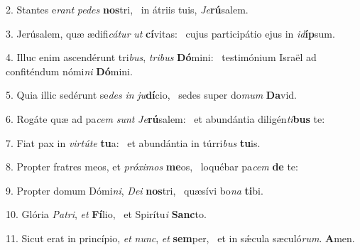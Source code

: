 2. Stantes e\textit{rant} \textit{pe}\textit{des} \textbf{nos}tri, \ast\  in átriis tuis, \textit{Je}\textbf{rú}salem.\

3. Jerúsalem, quæ ædifi\textit{cá}\textit{tur} \textit{ut} \textbf{cí}vitas: \ast\  cujus participátio ejus in \textit{id}\textbf{íp}sum.\

4. Illuc enim ascendérunt tri\textit{bus}, \textit{tri}\textit{bus} \textbf{Dó}mini: \ast\  testimónium Israël ad confiténdum nómi\textit{ni} \textbf{Dó}mini.\

5. Quia illic sedérunt se\textit{des} \textit{in} \textit{ju}\textbf{dí}cio, \ast\  sedes super do\textit{mum} \textbf{Da}vid.\

6. Rogáte quæ ad pa\textit{cem} \textit{sunt} \textit{Je}\textbf{rú}salem: \ast\  et abundántia diligén\textit{ti}\textbf{bus} te:\

7. Fiat pax in \textit{vir}\textit{tú}\textit{te} \textbf{tu}a: \ast\  et abundántia in túrri\textit{bus} \textbf{tu}is.\

8. Propter fratres meos, et \textit{pró}\textit{xi}\textit{mos} \textbf{me}os, \ast\  loquébar pa\textit{cem} \textbf{de} te:\

9. Propter domum Dómi\textit{ni}, \textit{De}\textit{i} \textbf{nos}tri, \ast\  quæsívi bo\textit{na} \textbf{ti}bi.\

10. Glória \textit{Pa}\textit{tri}, \textit{et} \textbf{Fí}lio, \ast\  et Spirítu\textit{i} \textbf{Sanc}to.\

11. Sicut erat in princípio, \textit{et} \textit{nunc}, \textit{et} \textbf{sem}per, \ast\  et in sǽcula sæculó\textit{rum}. \textbf{A}men.\

